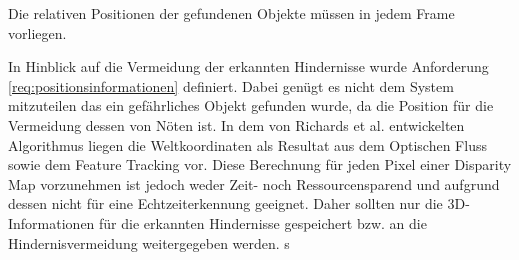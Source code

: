 	\begin{anforderung}
	\label{req:positionsinformationen}
		Die relativen Positionen der gefundenen Objekte müssen in jedem Frame vorliegen.
	\end{anforderung}
	
In Hinblick auf die Vermeidung der erkannten Hindernisse wurde Anforderung \ref{req:positionsinformationen} definiert. Dabei genügt es nicht dem System mitzuteilen das ein gefährliches Objekt gefunden wurde, da die Position für die Vermeidung dessen von Nöten ist. In dem von Richards et al. \cite{richards2014obstacle} entwickelten Algorithmus liegen die Weltkoordinaten als Resultat aus dem Optischen Fluss sowie dem Feature Tracking vor. Diese Berechnung für jeden Pixel einer Disparity Map vorzunehmen ist jedoch weder Zeit- noch Ressourcensparend und aufgrund dessen nicht für eine Echtzeiterkennung geeignet. Daher sollten nur die 3D-Informationen für die erkannten Hindernisse gespeichert bzw. an die Hindernisvermeidung weitergegeben werden. s

